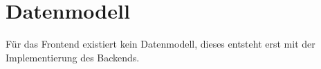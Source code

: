 \section{Datenmodell}
\label{sec:datenmodell}

  Für das Frontend existiert kein Datenmodell, dieses entsteht erst mit der Implementierung des Backends.
